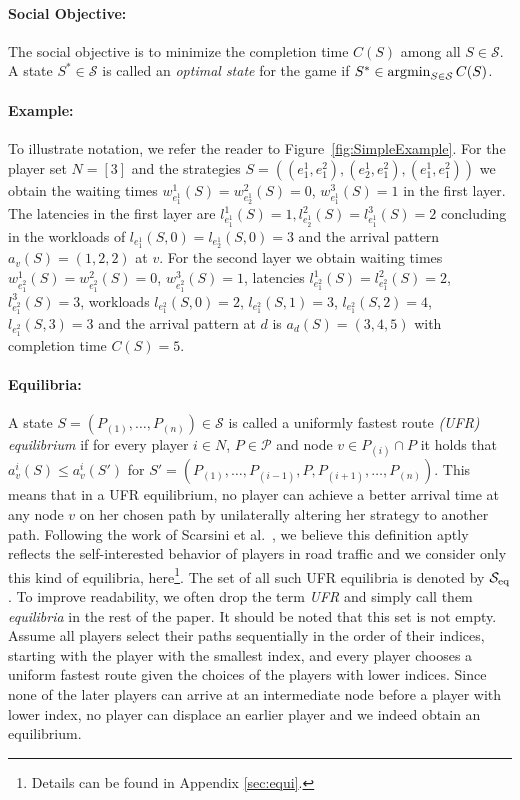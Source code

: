 \paragraph{Social Objective:} 
The social objective is to minimize the completion time $C(S)$ among all $S\in \mathcal{S}$.
A state $S^*\in\mathcal{S}$ is called an \emph{optimal state} for the game if $S^* \in \operatorname*{arg\!\min}_{S \in \mathcal{S}} C(S)$.

\paragraph{Example:} 
To illustrate notation, we refer the reader to Figure~\ref{fig:SimpleExample}. For the player set $N=[3]$ and the strategies $S=((e_1^1, e_1^2),(e_2^1, e_1^2),(e_1^1, e_1^2))$ we obtain the waiting times $w_{e_1^1}^1(S)=w_{e_2^1}^2(S)=0$, $w_{e_1^1}^3(S)=1$ in the first layer. The latencies in the first layer are $l_{e_1^1}^1(S)= 1, l_{e_2^1}^2(S)=l_{e_1^1}^3(S)=2$ concluding in the workloads of $l_{e_1^1}(S,0)= l_{e_2^1}(S,0)=3$ and the arrival pattern $a_v(S)=(1,2,2)$ at $v$.
 For the second layer we obtain waiting times $w_{e_1^2}^1(S)=w_{e_1^2}^2(S)=0$, $w_{e_1^2}^3(S)=1$, latencies $l_{e_1^2}^1(S)= l_{e_1^2}^2(S)=2$, $l_{e_1^2}^3(S)=3$, workloads $l_{e_1^2}(S,0)=2$, $l_{e_1^2}(S,1)=3$, $l_{e_1^2}(S,2)=4$, $l_{e_1^2}(S,3)=3$ and the arrival pattern at $d$ is $a_d(S)=(3,4,5)$ with completion time $C(S)=5$.

\paragraph{Equilibria:}
A state $S=(P_{(1)}, \dots, P_{(n)}) \in \mathcal{S}$ is called a uniformly fastest route \emph{(UFR) equilibrium} if for every player $i\in N$, $P\in\mathcal{P}$ and node $v\in P_{(i)}\cap P$ it holds that $a_{v}^i(S)\leq a_{v}^i(S')$ for $S'=(P_{(1)}, \dots, P_{(i-1)}, P, P_{(i+1)}, \dots, P_{(n)})$.
 This means that in a UFR equilibrium, no player can achieve a better arrival time at any node $v$ on her chosen path by unilaterally altering her strategy to another path. Following the work of Scarsini et al.~\cite{DBLP:journals/ior/ScarsiniST18}, we believe this definition aptly
reflects the self-interested behavior of players in road traffic and we consider only this kind of equilibria, here\footnote{Details can be found in Appendix \ref{sec:equi}.}. The set of all such UFR equilibria is denoted by $\mathcal{S}_{\operatorname{eq}}$. To improve readability, we often drop the term \emph{UFR} and simply call them \emph{equilibria} in the rest of the paper. It should be noted that this set is not empty. Assume all players select their paths sequentially in the order of their indices, starting with the player with the smallest index, and every player chooses a uniform fastest route given the choices of the players with lower indices. Since none of the later players can arrive at an intermediate node before a player with lower index, no player can displace an earlier player and we indeed obtain an equilibrium.

